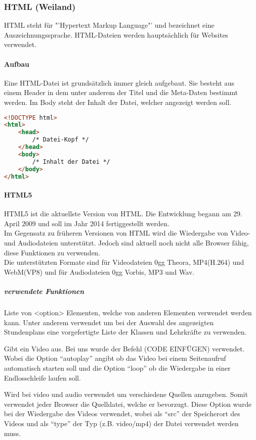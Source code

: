 \subsubsection{HTML (Weiland)}

HTML steht für "'Hypertext Markup Language"' und bezeichnet eine Auszeichnungssprache. HTML-Dateien werden hauptsächlich für Websites verwendet.


\paragraph{Aufbau}

Eine HTML-Datei ist grundsätzlich immer gleich aufgebaut. Sie besteht aus einem Header in dem unter anderem der Titel und die Meta-Daten bestimmt werden.
Im Body steht der Inhalt der Datei, welcher angezeigt werden soll. 
\begin{lstlisting}[style=custom, language=HTML, caption={HTML-Tags}]
<!DOCTYPE html>
<html> 
	<head>
		/* Datei-Kopf */
	</head>
	<body>
		/* Inhalt der Datei */
	</body>
</html>
\end{lstlisting}

\paragraph{HTML5}
HTML5 ist die aktuellste Version von HTML. Die Entwicklung begann am 29. April 2009 und soll im Jahr 2014 fertiggestellt werden.\\
Im Gegensatz zu früheren Versionen von HTML wird die Wiedergabe von Video- und Audiodateien unterstützt. Jedoch sind aktuell noch nicht alle Browser fähig, diese Funktionen zu verwenden.\\
Die unterstützten Formate sind für Videodateien 0gg Theora, MP4(H.264) und WebM(VP8) und für Audiodateien 0gg Vorbis, MP3 und Wav. \\
\subparagraph{verwendete Funktionen}
\begin{description}[style=nextline]
\item[datalist] Liste von <option> Elementen, welche von anderen Elementen verwendet werden kann. Unter anderem verwendet um bei der Auswahl des angezeigten Stundenplans eine vorgefertigte Liste der Klassen und Lehrkräfte zu verwenden.
\item[video] Gibt ein Video aus. Bei uns wurde der Befehl (CODE EINFÜGEN) verwendet. Wobei die Option \enquote{autoplay} angibt ob das Video bei einem Seitenaufruf automatisch starten soll und die Option \enquote{loop} ob die Wiedergabe in einer Endlosschleife laufen  soll.
\item[source] Wird bei video und audio verwendet um verschiedene Quellen anzugeben. Somit verwendet jeder Browser die Quelldatei, welche er bevorzugt. Diese Option wurde bei der Wiedergabe des Videos verwendet, wobei als \enquote{src} der Speicherort des Videos und als \enquote{type} der Typ (z.B. video/mp4) der Datei verwendet werden muss. 
\end{description}